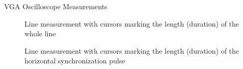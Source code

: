 \documentclass[10pt,a4paper,titlepage,oneside]{article}
\begin{document}
\maketitle



\begin{qa}{VGA Oscilloscope Measurements}

	\begin{figure}[h!]
		\centering
		\dummyimage
		\caption{Line measurement with cursors marking the length (duration) of the whole line}
	\end{figure}
	
	\begin{figure}[h!]
		\centering
		\dummyimage
		\caption{Line measurement with cursors marking the length (duration) of the horizontal synchronization pulse}
	\end{figure}
	

\end{qa}


\end{document}
